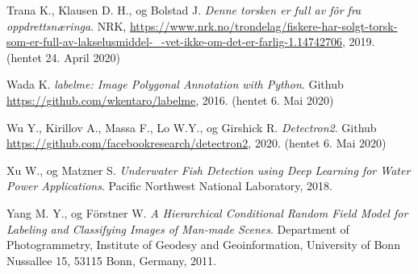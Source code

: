 \documentclass[11ot]{article}
\begin{document}
\begin{thebibliography}{9}
Trana K., Klausen D. H., og Bolstad J. 
\textit{Denne torsken er full av fôr fra oppdrettsnæringa}. 
NRK, \url{https://www.nrk.no/trondelag/fiskere-har-solgt-torsk-som-er-full-av-lakselusmiddel-_-vet-ikke-om-det-er-farlig-1.14742706}, 2019. (hentet 24. April 2020)

Wada K.
\textit{labelme: Image Polygonal Annotation with Python}. 
Github \url{https://github.com/wkentaro/labelme}, 2016. (hentet 6. Mai 2020)

Wu Y., Kirillov A., Massa F., Lo W.Y., og Girshick R.
\textit{Detectron2}. 
Github \url{https://github.com/facebookresearch/detectron2}, 2020. (hentet 6. Mai 2020)

Xu W., og Matzner S. 
\textit{Underwater Fish Detection using Deep Learning for Water Power Applications}. 
Pacific Northwest National Laboratory, 2018.

Yang M. Y., og Förstner W. 
\textit{A Hierarchical Conditional Random Field Model for Labeling and Classifying Images of Man-made Scenes}. 
Department of Photogrammetry, Institute of Geodesy and Geoinformation, University of Bonn Nussallee 15, 53115 Bonn, Germany, 2011.


\end{thebibliography}


%
%
\end{document}
